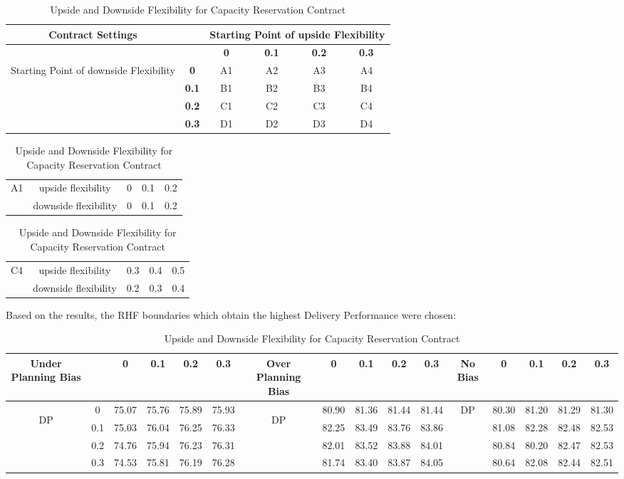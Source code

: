 \documentclass[12pt,english]{article}
\begin{document}
\begin{table}
\begin{tabular}{|c|c|c|c|c|c|}
\hline 
Contract Settings &  & \multicolumn{4}{c|}{Starting Point of upside Flexibility}\tabularnewline
\hline 
 &  & \multicolumn{1}{c||}{\textbf{0}} & \multicolumn{1}{c||}{\textbf{0.1}} & \multicolumn{1}{c||}{\textbf{0.2}} & \textbf{0.3}\tabularnewline
 \hline 
 \multirow{4}{*}{Starting Point of downside Flexibility} & \textbf{0} & A1 & A2 & A3 & A4\tabularnewline
 \cline{2-6} 
  & \textbf{0.1} & B1 & B2 & B3 & B4\tabularnewline
 \cline{2-6} 
  & \textbf{0.2} & C1 & C2 & C3 & C4\tabularnewline
 \cline{2-6} 
  & \textbf{0.3} & D1 & D2 & D3 & D4\tabularnewline
 \hline 
 \end{tabular}

\begin{tabular}{|c|c|c|c|c|}
\hline 
\multirow{2}{*}{A1} & upside flexibility & 0 & 0.1 & 0.2\tabularnewline
 \cline{2-5} 
  & downside flexibility & 0 & 0.1 & 0.2\tabularnewline
 \hline 
 \end{tabular}%
 \begin{tabular}{|c|c|c|c|c|}
 \hline 
 \multirow{2}{*}{C4} & upside flexibility & 0.3 & 0.4 & 0.5\tabularnewline
 \cline{2-5} 
  & downside flexibility & 0.2 & 0.3 & 0.4\tabularnewline
 \hline 
 \end{tabular}


 Based on the results, the RHF boundaries which obtain the highest
 Delivery Performance were chosen:

 \begin{tabular}{|c|c|c|c|c|c|c|c|c|c|c|c|c|c|c|c|}
 \hline 
 Under Planning Bias &  & 0 & 0.1 & 0.2 & 0.3 & Over Planning Bias & 0 & 0.1 & 0.2 & 0.3 & No Bias & 0 & 0.1 & 0.2 & 0.3\tabularnewline
 \hline 
 \hline 
 \multirow{4}{*}{\begin{turn}{90}
 DP 
 \end{turn}} & 0 & 75.07 & 75.76 & 75.89 & 75.93 & \multirow{4}{*}{\begin{turn}{90}
 DP
 \end{turn}} & 80.90 & 81.36 & 81.44 & 81.44 & \multirow{4}{*}{DP } & 80.30 & 81.20 & 81.29 & 81.30\tabularnewline
 \cline{2-6} \cline{8-11} \cline{13-16} 
  & 0.1 & 75.03 & 76.04 & 76.25 & 76.33 &  & 82.25 & 83.49 & 83.76 & 83.86 &  & 81.08 & 82.28 & 82.48 & 82.53\tabularnewline
 \cline{2-6} \cline{8-11} \cline{13-16} 
  & 0.2 & 74.76 & 75.94 & 76.23 & 76.31 &  & 82.01 & 83.52 & 83.88 & 84.01 &  & 80.84 & 80.20 & 82.47 & 82.53\tabularnewline
 \cline{2-6} \cline{8-11} \cline{13-16} 
  & 0.3 & 74.53 & 75.81 & 76.19 & 76.28 &  & 81.74 & 83.40 & 83.87 & 84.05 &  & 80.64 & 82.08 & 82.44 & 82.51\tabularnewline
 \hline 
 \end{tabular}

 \protect\caption{\label{tab:Upside-and-Downside-1}Upside and Downside Flexibility
 for Capacity Reservation Contract}

 \end{table}
\end{document}
